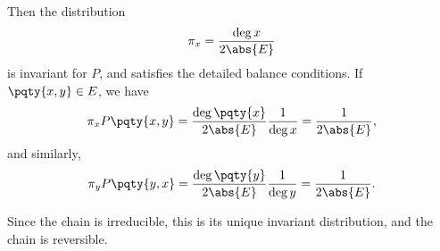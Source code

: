 \begin{examples}
\begin{enumerate}
        Then the distribution
        \[
            \pi_x = \frac{\deg x}{2 \abs{E}}
        \]
        is invariant for \(P\), and satisfies the detailed balance conditions. If \(\pqty{x, y} \in E\), we have
        \[
            \pi_x P\pqty{x, y} = \frac{\deg \pqty{x}}{2 \abs{E}} \frac{1}{\deg x} = \frac{1}{2 \abs{E}},
        \]
        and similarly,
        \[
            \pi_y P\pqty{y, x} = \frac{\deg \pqty{y}}{2 \abs{E}} \frac{1}{\deg y} = \frac{1}{2 \abs{E}}.
        \]

        Since the chain is irreducible, this is its unique invariant distribution, and the chain is reversible.
    \end{enumerate}
\end{examples}